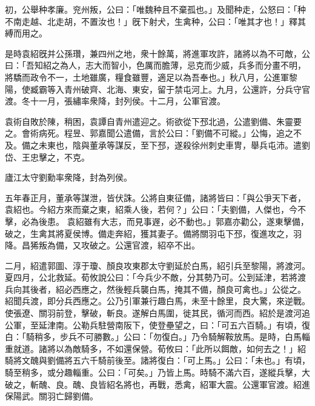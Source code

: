 \begin{pinyinscope}
初，公舉种孝廉。兖州叛，公曰：「唯魏种且不棄孤也。」及聞种走，公怒曰：「种不南走越、北走胡，不置汝也！」旣下射犬，生禽种，公曰：「唯其才也！」釋其縛而用之。


是時袁紹旣并公孫瓚，兼四州之地，衆十餘萬，將進軍攻許，諸將以為不可敵，公曰：「吾知紹之為人，志大而智小，色厲而膽薄，忌克而少威，兵多而分畫不明，將驕而政令不一，土地雖廣，糧食雖豐，適足以為吾奉也。」秋八月，公進軍黎陽，使臧霸等入青州破齊、北海、東安，留于禁屯河上。九月，公還許，分兵守官渡。冬十一月，張繡率衆降，封列侯。十二月，公軍官渡。


袁術自敗於陳，稍困，袁譚自青州遣迎之。術欲從下邳北過，公遣劉備、朱靈要之。會術病死。程昱、郭嘉聞公遣備，言於公曰：「劉備不可縱。」公悔，追之不及。備之未東也，陰與董承等謀反，至下邳，遂殺徐州刺史車冑，舉兵屯沛。遣劉岱、王忠擊之，不克。


廬江太守劉勳率衆降，封為列侯。


五年春正月，董承等謀泄，皆伏誅。公將自東征備，諸將皆曰：「與公爭天下者，袁紹也。今紹方來而棄之東，紹乘人後，若何？」公曰：「夫劉備，人傑也，今不擊，必為後患。
袁紹雖有大志，而見事遟，必不動也。」郭嘉亦勸公，遂東擊備，破之，生禽其將夏侯博。備走奔紹，獲其妻子。備將關羽屯下邳，復進攻之，羽降。昌狶叛為備，又攻破之。公還官渡，紹卒不出。


二月，紹遣郭圖、淳于瓊、顏良攻東郡太守劉延於白馬，紹引兵至黎陽，將渡河。夏四月，公北救延。荀攸說公曰：「今兵少不敵，分其勢乃可。公到延津，若將渡兵向其後者，紹必西應之，然後輕兵襲白馬，掩其不備，顏良可禽也。」公從之。紹聞兵渡，即分兵西應之。公乃引軍兼行趣白馬，未至十餘里，良大驚，來逆戰。使張遼、關羽前登，擊破，斬良。遂解白馬圍，徙其民，循河而西。紹於是渡河追公軍，至延津南。公勒兵駐營南阪下，使登壘望之，曰：「可五六百騎。」有頃，復白：「騎稍多，步兵不可勝數。」公曰：「勿復白。」乃令騎解鞍放馬。是時，白馬輜重就道。諸將以為敵騎多，不如還保營。荀攸曰：「此所以餌敵，如何去之！」紹騎將文醜與劉備將五六千騎前後至。諸將復白：「可上馬。」公曰：「未也。」有頃，騎至稍多，或分趣輜重。公曰：「可矣。」乃皆上馬。時騎不滿六百，遂縱兵擊，大破之，斬醜、良。醜、良皆紹名將也，再戰，悉禽，紹軍大震。公還軍官渡。紹進保陽武。關羽亡歸劉備。



\end{pinyinscope}
